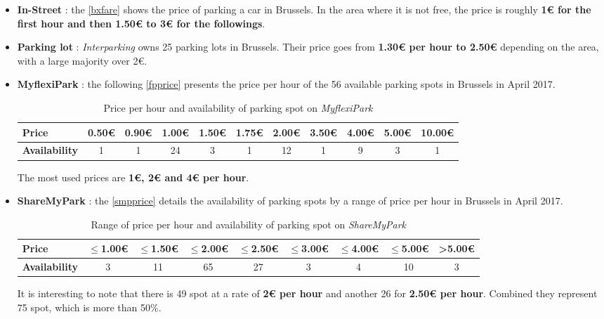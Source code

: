\documentclass[12pt,a4paper,oneside]{book}
\begin{document}
\begin{itemize}
\item \textbf{In-Street} : the \autoref{bxfare} shows the price of parking a car in Brussels. In the area where it is not free, the price is roughly \textbf{1\euro{} for the first hour and then 1.50\euro{} to 3\euro{} for the followings}.
\item \textbf{Parking lot} : \textit{Interparking} owns 25 parking lots in Brussels. Their price goes from \textbf{1.30\euro{} per hour to 2.50\euro{}} depending on the area, with a large majority over 2\euro{}.\cite{interpk}
\item \textbf{MyflexiPark} : the following \autoref{fpprice} presents the price per hour of the 56 available parking spots in Brussels in April 2017.

\begin{table}[h]
\centering
\caption{Price per hour and availability of parking spot on \textit{MyflexiPark}}
\label{fpprice}
\begin{adjustbox}{center}
\begin{tabular}{@{}lcccccccccc@{}}
\toprule
\textbf{Price}  & 0.50\euro{} & 0.90\euro{} & 1.00\euro{} & 1.50\euro{} & 1.75\euro{} & 2.00\euro{} & 3.50\euro{} & 4.00\euro{} & 5.00\euro{} & 10.00\euro{} \\ \midrule
\textbf{Availability} & 1           & 1           & 24          & 3           & 1           & 12          & 1           & 9           & 3           & 1            \\ \bottomrule
\end{tabular}
\end{adjustbox}
\end{table}

The most used prices are \textbf{1\euro{}, 2\euro{} and 4\euro{} per hour}.

\item \textbf{ShareMyPark} : the \autoref{smpprice} details the availability of parking spots by a range of price per hour in Brussels in April 2017.

\begin{table}[h]
\centering
\caption{Range of price per hour and availability of parking spot on \textit{ShareMyPark}}
\label{smpprice}
\begin{adjustbox}{center}
\begin{tabular}{@{}lcccccccc@{}}
\toprule
\textbf{Price}       & $\leq$1.00\euro{} & $\leq$1.50\euro{} & $\leq$2.00\euro{} & $\leq$2.50\euro{} & $\leq$3.00\euro{} & $\leq$4.00\euro{} & $\leq$5.00\euro{} & >5.00\euro{} \\ \midrule
\textbf{Availability} & 3            & 11           & 65           & 27           & 3            & 4            & 10           & 3           \\\bottomrule
\end{tabular}
\end{adjustbox}
\end{table}

It is interesting to note that there is 49 spot at a rate of \textbf{2\euro{} per hour} and another 26 for \textbf{2.50\euro{} per hour}. Combined they represent 75 spot, which is more than 50\%.
\end{itemize}
\end{document}
